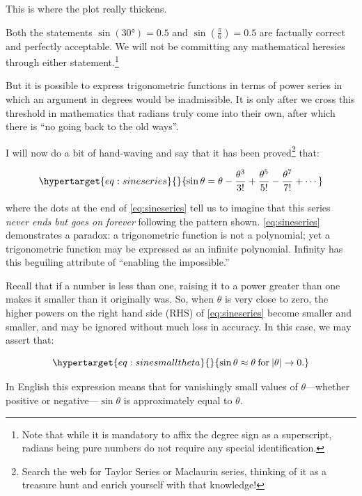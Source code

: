 \documentclass[
  a4paper,
]{article}
\begin{document}
This is where the plot really thickens.

Both the statements \(\sin(30°)=0.5\) and \(\sin(\frac{\pi}{6})=0.5\)
are factually correct and perfectly acceptable. We will not be
committing any mathematical heresies through either
statement.\footnote{Note that while it is mandatory to affix the degree
  sign as a superscript, radians being pure numbers do not require any
  special identification.}

But it is possible to express trigonometric functions in terms of power
series in which an argument in degrees would be inadmissible. It is only
after we cross this threshold in mathematics that radians truly come
into their own, after which there is ``no going back to the old ways''.

I will now do a bit of hand-waving and say that it has been
proved\footnote{Search the web for Taylor Series or Maclaurin series,
  thinking of it as a treasure hunt and enrich yourself with that
  knowledge!} that:

\begin{equation}\protect\hypertarget{eq:sineseries}{}{
\sin\theta = \theta - \frac{\theta^3}{3!} + \frac{\theta^5}{5!} - \frac{\theta^7}{7!} + \cdots
}\label{eq:sineseries}\end{equation}

where the dots at the end of \cref{eq:sineseries} tell us to imagine
that this series \emph{never ends but goes on forever} following the
pattern shown. \cref{eq:sineseries} demonstrates a paradox: a
trigonometric function is not a polynomial; yet a trigonometric function
may be expressed as an infinite polynomial. Infinity has this beguiling
attribute of ``enabling the impossible.''

Recall that if a number is less than one, raising it to a power greater
than one makes it smaller than it originally was. So, when \(\theta\) is
very close to zero, the higher powers on the right hand side (RHS) of
\cref{eq:sineseries} become smaller and smaller, and may be ignored
without much loss in accuracy. In this case, we may assert that:

\begin{equation}\protect\hypertarget{eq:sinesmalltheta}{}{
\sin\theta\approx\theta \:\text{for}\: \lvert\theta\rvert \to 0.
}\label{eq:sinesmalltheta}\end{equation}

In English this expression means that for vanishingly small values of
\(\theta\)---whether positive or negative---\(\sin\theta\) is
approximately equal to \(\theta\).
\end{document}
